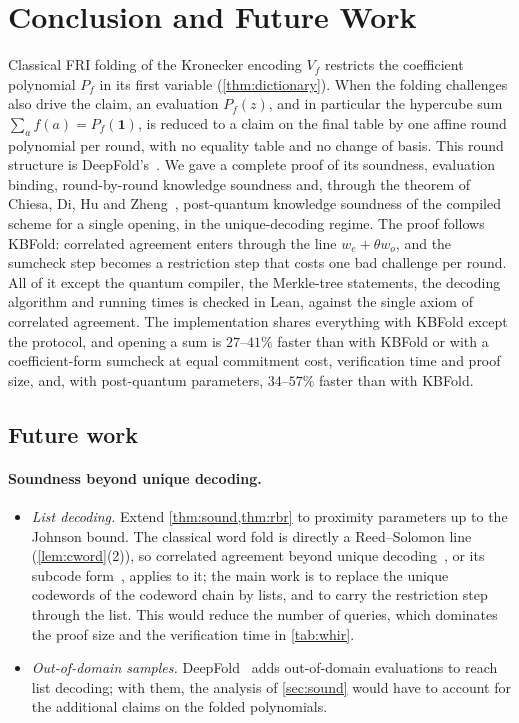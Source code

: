\section{Conclusion and Future Work}\label{sec:concl}

Classical FRI folding of the Kronecker encoding $V_f$ restricts the coefficient polynomial $P_f$ in its first variable (\cref{thm:dictionary}).
When the folding challenges also drive the claim, an evaluation $P_f(z)$, and in particular the hypercube sum $\sum_a f(a) = P_f(\mathbf 1)$, is reduced to a claim on the final table by one affine round polynomial per round, with no equality table and no change of basis.
This round structure is DeepFold's~\cite{GLHQTZ25}.
We gave a complete proof of its soundness, evaluation binding, round-by-round knowledge soundness and, through the theorem of Chiesa, Di, Hu and Zheng~\cite{CDHZ25}, post-quantum knowledge soundness of the compiled scheme for a single opening, in the unique-decoding regime.
The proof follows KBFold: correlated agreement enters through the line $w_e + \theta w_o$, and the sumcheck step becomes a restriction step that costs one bad challenge per round.
All of it except the quantum compiler, the Merkle-tree statements, the decoding algorithm and running times is checked in Lean, against the single axiom of correlated agreement.
The implementation shares everything with KBFold except the protocol, and opening a sum is $27$--$41\%$ faster than with KBFold or with a coefficient-form sumcheck at equal commitment cost, verification time and proof size, and, with post-quantum parameters, $34$--$57\%$ faster than with KBFold.

\subsection{Future work}\label{sec:concl:future}

\paragraph{Soundness beyond unique decoding.}
\begin{itemize}
  \item \emph{List decoding.} Extend \cref{thm:sound,thm:rbr} to proximity parameters up to the Johnson bound. The classical word fold is directly a Reed--Solomon line (\cref{lem:cword}(2)), so correlated agreement beyond unique decoding~\cite{BCIKS23}, or its subcode form~\cite{Hab24}, applies to it; the main work is to replace the unique codewords of the codeword chain by lists, and to carry the restriction step through the list. This would reduce the number of queries, which dominates the proof size and the verification time in \cref{tab:whir}.
  \item \emph{Out-of-domain samples.} DeepFold~\cite{GLHQTZ25} adds out-of-domain evaluations to reach list decoding; with them, the analysis of \cref{sec:sound} would have to account for the additional claims on the folded polynomials.
\end{itemize}

